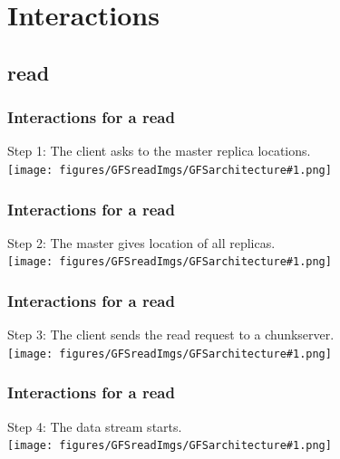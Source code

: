 \documentclass{beamer}
\begin{document}
\section{Interactions}
\subsection{read}
\newcommand{\readslide}[2]{\begin{frame}\frametitle{Interactions for a read}\alert{Step #1}: #2\vspace{1cm}\\\centering\texttt{[image: figures/GFSreadImgs/GFSarchitecture\#1.png]}\end{frame}}
\readslide{1}{The client asks to the master replica locations.}
\readslide{2}{The master gives location of all replicas.}
\readslide{3}{The client sends the read request to a chunkserver.}
\readslide{4}{The data stream starts.}

\newcommand{\writeslide}[2]{\begin{frame}\frametitle{Interactions for a write}\alert{Step #1}: #2\vspace{0.3cm}\\\centering\texttt{[image: figures/GFSflowImgs/GFSflow\#1.png]}\end{frame}}
\end{document}
